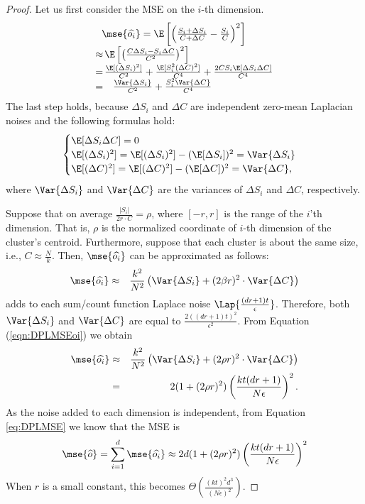 \begin{proof}
Let us first consider the MSE on the $i$-th dimension.
$$
\begin{array}{rl}
 & \hspace{-0.4cm}\mse{\widehat{o_i}} = \E\left[ \left( \frac{S_i + \Delta S_i}{C + \Delta C} - \frac{S_i}{C}\right)^2 \right]
\\
 \approx &\hspace{-0.3cm} \E\left[ \left(\frac{C \Delta S_i  - S_i \Delta C}{C^2} \right)^2 \right]\nonumber
\\
 = &\hspace{-0.3cm} \frac{\E[(\Delta S_i)^2]}{C^2} +  \frac{\E[S_i^2 (\Delta C)^2]}{C^4} + \frac{2CS_i\E[\Delta S_i \Delta C]}{C^4} \\
 = & \frac{\Var{\Delta S_i}}{C^2} +  \frac{S_i^2\Var{\Delta C}}{C^4}
\end{array}
$$
The last step holds, because $\Delta S_i$ and $\Delta C$ are independent zero-mean Laplacian noises and the following formulas hold:
$$
\begin{cases}
\E[\Delta S_i \Delta C]=0\\
\E[(\Delta S_i)^2]=\E[(\Delta S_i)^2]-(\E[\Delta S_i])^2=\Var{\Delta S_i}\\
\E[(\Delta C)^2] =\E[(\Delta C)^2]-(\E[\Delta C])^2= \Var{\Delta C},
\end{cases} \nonumber
$$
where $\Var{\Delta S_i}$ and $\Var{\Delta C}$ are the variances of $\Delta S_i$ and $\Delta C$, respectively. 

Suppose that on average $\frac{|S_i|}{2r\cdot C}=\rho$, where $[-r,r]$ is the range of the $i$'th dimension. That is, $\rho$ is the normalized coordinate of $i$-th dimension of the cluster's centroid. Furthermore, suppose that each cluster is about the same size, i.e., $C\approx \frac{N}{k}$. Then, $\mse{\widehat{o_i}}$ can be approximated as follows:
\begin{eqnarray}
\mse{\widehat{o_i}} & \approx &   \frac{k^2}{N^2} \left( \Var{\Delta S_i} +  (2\beta r)^2 \cdot \Var{\Delta C} \right) \label{eqn:DPLMSEoi}
\end{eqnarray}
\dpl adds to each sum/count function Laplace noise $\Lap{\frac{(dr+1)t}{\epsilon}}$. Therefore, both $\Var{\Delta S_i}$ and $\Var{\Delta C}$ are equal to $\frac{2((dr+1)t)^2}{\epsilon^2}$. From Equation (\ref{eqn:DPLMSEoi}) we obtain
\begin{eqnarray*}
\mse{\widehat{o_i}} & \approx &\frac{k^2}{N^2} \left( \Var{\Delta S_i} +  (2\rho r)^2 \cdot \Var{\Delta C} \right) \\
& = & 2 (1+(2\rho r)^2) \left(\frac{kt(dr+1)}{N\epsilon}\right)^2.
\end{eqnarray*}
As the noise added to each dimension is independent, from Equation \ref{eq:DPLMSE} we know that the MSE is
\begin{eqnarray}\label{eqn:DPLMSE_approx}
\mse{\widehat{o}} = \sum_{i=1}^d \mse{\widehat{o_i}} \approx 2d (1+(2\rho r)^2) \left(\frac{kt(dr+1)}{N\epsilon}\right)^2
\end{eqnarray}
When $r$ is a small constant, this becomes $\Theta\left(\frac{(kt)^2 d^3}{(N\epsilon)^2}\right)$.
\end{proof}

